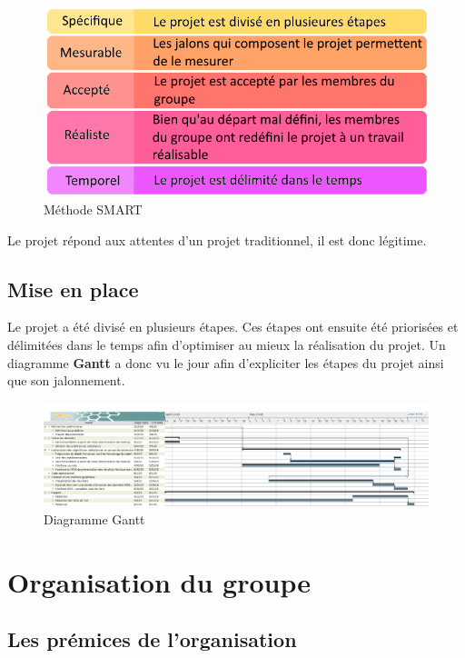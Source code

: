 \documentclass{article}
\begin{document}
\begin{figure}[H]
    \centering
    \includegraphics[scale=0.5]{GDP/smart.png}
    \caption{\label{smart} Méthode SMART}
\end{figure}

Le projet répond aux attentes d'un projet traditionnel, il est donc légitime.


\subsection{Mise en place}

Le projet a été divisé en plusieurs étapes. Ces étapes ont ensuite été priorisées et délimitées dans le temps afin d'optimiser au mieux la réalisation du projet. Un diagramme \textbf{Gantt} a donc vu le jour afin d'expliciter les étapes du projet ainsi que son jalonnement.

\begin{figure}[H]
    \centering
   \includegraphics[scale=0.23]{GDP/gantt.png}
    \caption{\label{gant} Diagramme Gantt}
\end{figure}

\section{Organisation du groupe}
\subsection{Les prémices de l'organisation}
\end{document}
